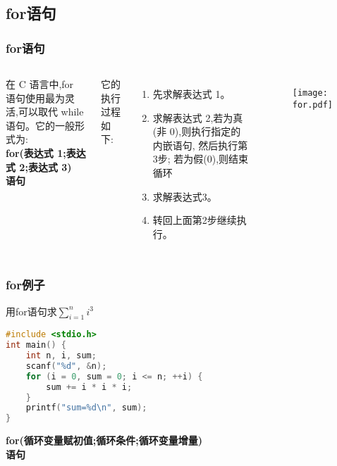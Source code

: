\documentclass[cjk,slidestop,mathserif,hyperref={CJKbookmarks=true}]{beamer}
\begin{document}
\begin{CJK*}{UTF8}{gkai}
\subsection{for语句}
\begin{frame}[fragile]
    \frametitle{for语句}
    \begin{columns}
        \column{6.5cm}
            \begin{definition}
                在 C 语言中,for 语句使用最为灵活,可以取代 while 语句。它的一般形式为:\\
                \textbf{
                \quad for(表达式 1;表达式 2;表达式 3) \\
                \qquad 语句}
            \end{definition}
            它的执行过程如下:
            \begin{enumerate}
                \item 先求解表达式 1。
                \item 求解表达式 2,若为真(非 0),则执行指定的内嵌语句,
                    然后执行第3步;
                    若为假(0),则结束循环
                \item 求解表达式3。
                \item 转回上面第2步继续执行。
            \end{enumerate}
        \column{4.5cm}
            \begin{figure}[!t]
                \texttt{[image: for.pdf]}
            \end{figure}
    \end{columns}
\end{frame}

\begin{frame}[fragile]
    \frametitle{for例子}

    用for语句求$\sum\limits_{i=1}^{n}i^3$
    \begin{lstlisting}[language=c]
#include <stdio.h>
int main() {
    int n, i, sum;
    scanf("%d", &n);
    for (i = 0, sum = 0; i <= n; ++i) {
        sum += i * i * i;
    }
    printf("sum=%d\n", sum);
}
    \end{lstlisting}
\textbf{for(循环变量赋初值;循环条件;循环变量增量) \\ \qquad 语句}

\end{frame}


\end{CJK*}
\end{document}
